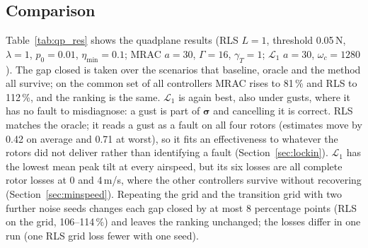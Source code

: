 \documentclass[preprint,12pt,a4paper]{elsarticle}
\newcommand{\vect}[1]{\bm{#1}}
\begin{document}
\subsection{Comparison}
\begin{table}[t]
\centering\small
\caption{Quadplane. Mean peak tilt over the grid scenarios (72 faults at 0--12\,m/s) and the Monte Carlo scenarios survived by all
controllers; gap closed with 95\,\% bootstrap interval over the scenarios that baseline, oracle and the method survive (common set of all
controllers in brackets); gust response (false detection: mean / worst estimate drift); delay margin in hover and at 8\,m/s. Losses: of 72 grid runs.}
\label{tab:qp_res}
\end{table}
Table~\ref{tab:qp_res} shows the quadplane results (RLS $L = 1$, threshold 0.05\,N, $\lambda = 1$, $p_0 = 0.01$, $\eta_{\min} = 0.1$;
MRAC $a = 30$, $\Gamma = 16$, $\gamma_T = 1$; $\mathcal{L}_1$ $a = 30$, $\omega_c = 1280$). The gap closed is taken over the scenarios
that baseline, oracle and the method all survive; on the common set of all controllers MRAC rises to 81\,\% and RLS to 112\,\%, and the
ranking is the same. $\mathcal{L}_1$ is again best, also under gusts, where it has no fault to misdiagnose: a gust is part of $\vect\sigma$
and cancelling it is correct. RLS matches the oracle; it reads a gust as a fault on all four rotors (estimates move by 0.42 on average and
0.71 at worst), so it fits an effectiveness to whatever the rotors did not deliver rather than identifying a fault
(Section~\ref{sec:lockin}). $\mathcal{L}_1$ has the lowest mean peak tilt at every airspeed, but its six losses are all complete rotor
losses at 0 and 4\,m/s, where the other controllers survive without recovering (Section~\ref{sec:minspeed}). Repeating the grid and the transition
grid with two further noise seeds changes each gap closed by at most 8 percentage points (RLS on the grid, 106--114\,\%) and leaves the ranking
unchanged; the losses differ in one run (one RLS grid loss fewer with one seed).
\end{document}
